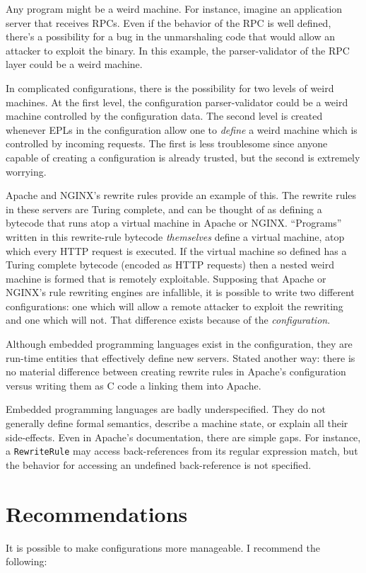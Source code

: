 \documentclass[letterpaper,twocolumn,10pt]{article}
\begin{document}
Any program might be a weird machine. For instance, imagine an application server that receives RPCs. Even if the behavior of the RPC is well defined, there's a possibility for a bug in the unmarshaling code that would allow an attacker to exploit the binary. In this example, the parser-validator of the RPC layer could be a weird machine.

In complicated configurations, there is the possibility for two levels of weird machines. At the first level, the configuration parser-validator could be a weird machine controlled by the configuration data. The second level is created whenever EPLs in the configuration allow one to \emph{define} a weird machine which is controlled by incoming requests. The first is less troublesome since anyone capable of creating a configuration is already trusted, but the second is extremely worrying.

Apache and NGINX's rewrite rules provide an example of this. The rewrite rules in these servers are Turing complete, and can be thought of as defining a bytecode that runs atop a virtual machine in Apache or NGINX. ``Programs'' written in this rewrite-rule bytecode \emph{themselves} define a virtual machine, atop which every HTTP request is executed. If the virtual machine so defined has a Turing complete bytecode (encoded as HTTP requests) then a nested weird machine is formed that is remotely exploitable. Supposing that Apache or NGINX's rule rewriting engines are infallible, it is possible to write two different configurations: one which will allow a remote attacker to exploit the rewriting and one which will not. That difference exists because of the \emph{configuration}.

Although embedded programming languages exist in the configuration, they are run-time entities that effectively define new servers. Stated another way: there is no material difference between creating rewrite rules in Apache's configuration versus writing them as C code a linking them into Apache.

Embedded programming languages are badly underspecified. They do not generally define formal semantics, describe a machine state, or explain all their side-effects. Even in Apache's documentation, there are simple gaps. For instance, a \texttt{RewriteRule} may access back-references from its regular expression match, but the behavior for accessing an undefined back-reference is not specified.


\section{Recommendations}
It is possible to make configurations more manageable. I recommend the following:
\end{document}
